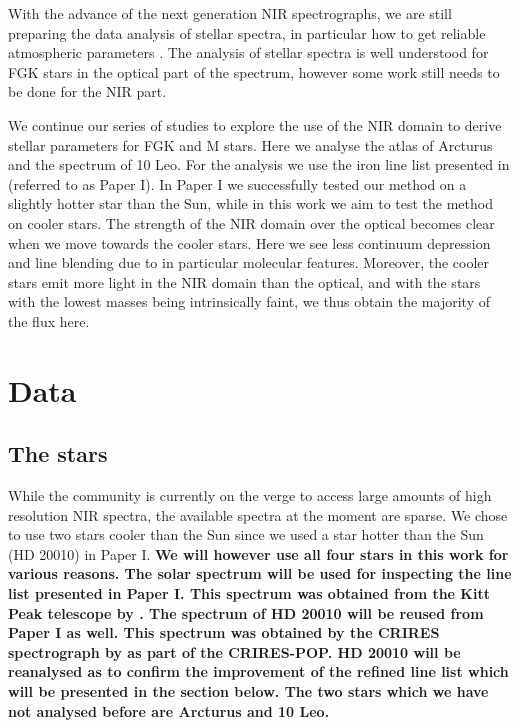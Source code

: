 \documentclass{aa}
\begin{document}
With the advance of the next generation NIR spectrographs, we are still
preparing the data analysis of stellar spectra, in particular how to get
reliable atmospheric parameters \citep[see e.g.][]{Onehag2012,Lindgren2016,Andreasen2016}.
The analysis of stellar spectra is well understood for FGK stars in the optical
part of the spectrum, however some work still needs to be done for the NIR part.

We continue our series of studies to explore the use of the NIR domain to derive
stellar parameters for FGK and M stars. Here we analyse the atlas of Arcturus
and the spectrum of 10 Leo. For the analysis we use the iron line list presented
in \citet{Andreasen2016} (referred to as Paper I). In Paper I we successfully
tested our method on a slightly hotter star than the Sun, while in this work we
aim to test the method on cooler stars. The strength of the NIR domain over the
optical becomes clear when we move towards the cooler stars. Here we see less
continuum depression and line blending due to in particular molecular features.
Moreover, the cooler stars emit more light in the NIR domain than the optical,
and with the stars with the lowest masses being intrinsically faint, we thus
obtain the majority of the flux here.



\section{Data}
\label{sec:data}

\subsection{The stars}

While the community is currently on the verge to access large amounts of high
resolution NIR spectra, the available spectra at the moment are sparse. We chose
to use two stars cooler than the Sun since we used a star hotter than the Sun
(HD 20010) in Paper I. {\bf We will however use all four stars in this work for
various reasons. The solar spectrum will be used for inspecting the line list
presented in Paper I. This spectrum was obtained from the Kitt Peak telescope by
\citet{Hinkle1995}. The spectrum of HD 20010 will be reused from Paper I as
well. This spectrum was obtained by the CRIRES spectrograph by
\citet{Lebzelter2012} as part of the CRIRES-POP. HD 20010 will be reanalysed as
to confirm the improvement of the refined line list which will be presented in
the section below. The two stars which we have not analysed before are Arcturus
and 10 Leo.}
\end{document}
